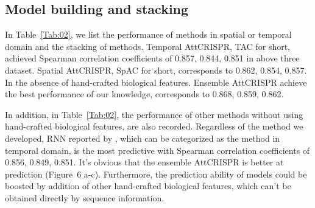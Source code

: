 \documentclass{bioinfo}
\begin{document}
\subsection{Model building and stacking}\label{section:stacking}

In Table~\ref{Tab:02}, we list the performance of methods in spatial or temporal domain and the stacking of methods. 
Temporal AttCRISPR, TAC for short, achieved Spearman correlation coefficients of 0.857, 0.844, 0.851 in above three dataset. 
Spatial AttCRISPR, SpAC for short, corresponds to 0.862, 0.854, 0.857. In the absence of hand-crafted biological features. 
Ensemble AttCRISPR achieve the best performance of our knowledge, corresponds to 0.868, 0.859, 0.862. 

In addition, in Table~\ref{Tab:02}, the performance of other methods without using hand-crafted biological features, are also recorded. 
Regardless of the method we developed, RNN reported by \citeauthor{wang2019optimized}, which can be categorized as the method in temporal domain, 
is the most predictive with Spearman correlation coefficients of 0.856, 0.849, 0.851. 
It's obvious that the ensemble AttCRISPR is better at prediction (Figure~6\vphantom{\ref{fig:06}} a-c). 
Furthermore, the prediction ability of models could be boosted by addition of other hand-crafted biological features, which can't be obtained directly by sequence information. 
\end{document}
